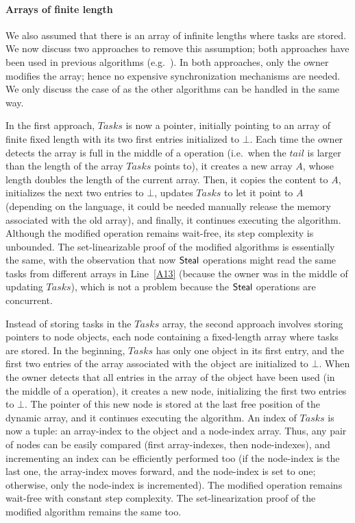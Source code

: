 \paragraph*{Arrays of finite length}
We also assumed that there is an array of infinite lengths where tasks are stored. We now discuss two approaches to remove this assumption; both approaches have been used in previous algorithms (e.g.~\cite{DBLP_conf_wdag_AdasF20, DBLP_conf_opodis_AfekKY10, maged.vechev.2009, non.blocking.work.stealing, DBLP_conf_ppopp_YangM16}).  In both approaches, only the owner modifies the array; hence no expensive synchronization mechanisms are needed.  We only discuss the case of \WFWSM{} as the other algorithms can be handled in the same way.

In the first approach, \(Tasks\) is now a pointer, initially pointing to an array of finite fixed length with its two first entries initialized to \(\bot\). Each time the owner detects the array is full in the middle of a \Put{} operation (i.e.\ when the \(tail\) is larger than the length of the array \(Tasks\) points to), it creates a new array \(A\), whose length doubles the length of the current array.  Then, it copies the content to \(A\), initializes the next two entries to \(\bot\), updates \(Tasks\) to let it point to \(A\) (depending on the language, it could be needed manually release the memory associated with the old array), and finally, it continues executing the algorithm. Although the modified \Put{} operation remains wait-free, its step complexity is unbounded.  The set-linearizable proof of the modified algorithms is essentially the same, with the observation that now ${\sf \small Steal}$ operations might read the same tasks from different arrays in Line~\ref{A13} (because the owner was in the middle of updating $Tasks$), which is not a problem because the ${\sf \small Steal}$ operations are concurrent.

Instead of storing tasks in the \(Tasks\) array, the second approach involves storing pointers to node objects, each node containing a fixed-length array where tasks are stored. In the beginning, \(Tasks\) has only one object in its first entry, and the first two entries of the array associated with the object are initialized to \(\bot\).  When the owner detects that all entries in the array of the object have been used (in the middle of a \Put{} operation), it creates a new node, initializing the first two entries to \(\bot\). The pointer of this new node is stored at the last free position of the dynamic array, and it continues executing the algorithm. An index of \(Tasks\) is now a tuple: an array-index to the object and a node-index array. Thus, any pair of nodes can be easily compared (first array-indexes, then node-indexes), and incrementing an index can be efficiently performed too (if the node-index is the last one, the array-index moves forward, and the node-index is set to one; otherwise, only the node-index is incremented).  The modified \Put{} operation remains wait-free with constant step complexity. The set-linearization proof of the modified algorithm remains the same too.


